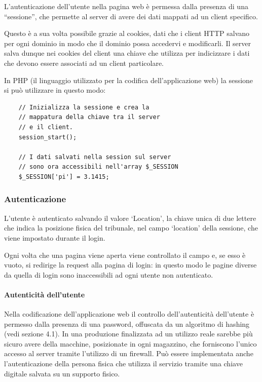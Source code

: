 L'autenticazione dell'utente nella pagina web è permessa dalla presenza di una ``sessione'', che permette al server di avere dei dati mappati ad un client specifico.

Questo è a sua volta possibile grazie al cookies, dati che i client HTTP salvano per ogni dominio in modo che il dominio possa accedervi e modificarli. Il server salva dunque nei cookies del client una chiave che utilizza per indicizzare i dati che devono essere associati ad un client particolare.

In PHP (il linguaggio utilizzato per la codifica dell'applicazione web) la sessione si può utilizzare in questo modo:
\lstset{language=php}
\begin{lstlisting}
    // Inizializza la sessione e crea la
    // mappatura della chiave tra il server
    // e il client.
    session_start();

    // I dati salvati nella session sul server
    // sono ora accessibili nell'array $_SESSION
    $_SESSION['pi'] = 3.1415;
\end{lstlisting}

\subsubsection{Autenticazione}

L'utente è autenticato salvando il valore `Location', la chiave unica di due lettere che indica la posizione fisica del tribunale, nel campo `location' della sessione, che viene impostato durante il login.

Ogni volta che una pagina viene aperta viene controllato il campo e, se esso è vuoto, si redirige la request alla pagina di login: in questo modo le pagine diverse da quella di login sono inaccessibili ad ogni utente non autenticato.

\paragraph{Autenticità dell'utente}
Nella codificazione dell'applicazione web il controllo dell'autenticità dell'utente è permesso dalla presenza di una password, offuscata da un algoritmo di hashing (vedi sezione 4.1). In una produzione finalizzata ad un utilizzo reale sarebbe più sicuro avere della macchine, posizionate in ogni magazzino, che forniscono l'unico accesso al server tramite l'utilizzo di un firewall. Può essere implementata anche l'autenticazione della persona fisica che utilizza il servizio tramite una chiave digitale salvata su un supporto fisico.

